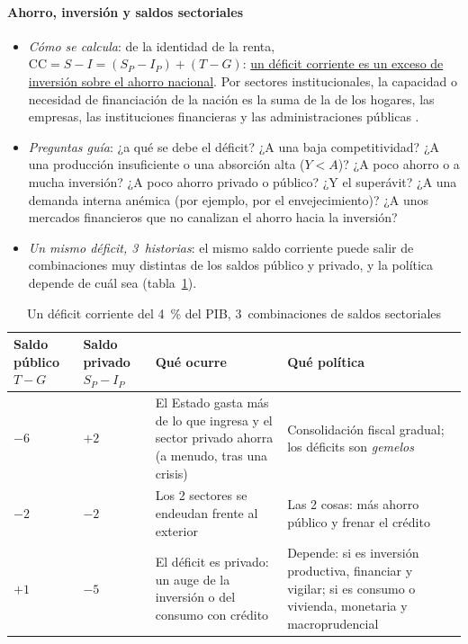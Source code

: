 \documentclass[11pt]{article}
\begin{document}
\paragraph{Ahorro, inversión y saldos sectoriales}
\begin{itemize}
\item \emph{Cómo se calcula}: de la identidad de la renta, $\mathrm{CC}=S-I=(S_P-I_P)+(T-G)$: \uline{un déficit corriente es un exceso de inversión sobre el ahorro nacional}. Por sectores institucionales, la capacidad o necesidad de financiación de la nación es la suma de la de los hogares, las empresas, las instituciones financieras y las administraciones públicas \parencite{SEC2010}.
\item \emph{Preguntas guía}: ¿a qué se debe el déficit? ¿A una baja competitividad? ¿A una producción insuficiente o una absorción alta ($Y<A$)? ¿A poco ahorro o a mucha inversión? ¿A poco ahorro privado o público? ¿Y el superávit? ¿A una demanda interna anémica (por ejemplo, por el envejecimiento)? ¿A unos mercados financieros que no canalizan el ahorro hacia la inversión?
\item \emph{Un mismo déficit, 3~historias}: el mismo saldo corriente puede salir de combinaciones muy distintas de los saldos público y privado, y la política depende de cuál sea (tabla~\ref{tab:saldos-sectoriales}).
\end{itemize}

\begin{table}[!htb]
\centering\small
\caption{Un déficit corriente del 4~\% del PIB, 3~combinaciones de saldos sectoriales}\label{tab:saldos-sectoriales}
\begin{tabular}{>{\centering\arraybackslash}m{2.2cm}>{\centering\arraybackslash}m{2.2cm}>{\raggedright\arraybackslash}m{4.4cm}>{\raggedright\arraybackslash}m{5.2cm}}
\toprule
\rowcolor{tceeazulpalido}
\textbf{Saldo público} $T-G$ & \textbf{Saldo privado} $S_P-I_P$ & \textbf{Qué ocurre} & \textbf{Qué política} \\
\midrule
\cellcolor{tceesalmon}$-6$ & \cellcolor{tceesalvia}$+2$ & El Estado gasta más de lo que ingresa y el sector privado ahorra (a menudo, tras una crisis) & Consolidación fiscal gradual; los déficits son \emph{gemelos} \\
\cellcolor{tceesalmon}$-2$ & \cellcolor{tceesalmon}$-2$ & Los 2 sectores se endeudan frente al exterior & Las 2 cosas: más ahorro público y frenar el crédito \\
\cellcolor{tceesalvia}$+1$ & \cellcolor{tceesalmon}$-5$ & El déficit es privado: un auge de la inversión o del consumo con crédito & Depende: si es inversión productiva, financiar y vigilar; si es consumo o vivienda, monetaria y macroprudencial \\
\bottomrule
\end{tabular}
\end{table}
\end{document}
